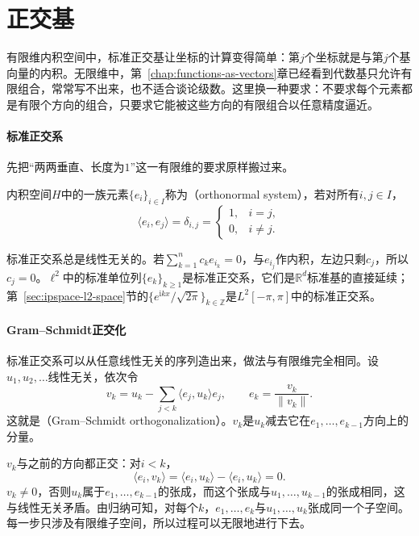 \section{正交基}
\label{sec:ipspace-orthonormal-bases}

有限维内积空间中，标准正交基让坐标的计算变得简单：第$j$个坐标就是与第$j$个基向量的内积。无限维中，第~\ref{chap:functions-as-vectors}章已经看到代数基只允许有限组合，常常写不出来，也不适合谈论级数。这里换一种要求：不要求每个元素都是有限个方向的组合，只要求它能被这些方向的有限组合以任意精度逼近。

\paragraph{标准正交系}
先把“两两垂直、长度为$1$”这一有限维的要求原样搬过来。

\begin{definition}[标准正交系]
\label{def:ipspace-orthonormal-system}
内积空间$H$中的一族元素$\{e_i\}_{i\in I}$称为（orthonormal system），若对所有$i,j\in I$，
\begin{equation}
 \langle e_i,e_j\rangle=\delta_{i,j}=\begin{cases}1,&i=j,\\0,&i\neq j.\end{cases}
 \label{eq:ipspace-orthonormal}
\end{equation}
\end{definition}

标准正交系总是线性无关的。若$\sum_{k=1}^nc_ke_{i_k}=0$，与$e_{i_j}$作内积，左边只剩$c_j$，所以$c_j=0$。$\ell^2$中的标准单位列$\{e_k\}_{k\geq1}$是标准正交系，它们是$\mathbb R^d$标准基的直接延续；第~\ref{sec:ipspace-l2-space}节的$\{e^{\mathrm ikx}/\sqrt{2\pi}\}_{k\in\mathbb Z}$是$L^2[-\pi,\pi]$中的标准正交系。

\paragraph{Gram--Schmidt正交化}
标准正交系可以从任意线性无关的序列造出来，做法与有限维完全相同。设$u_1,u_2,\ldots$线性无关，依次令
\begin{equation}
 v_k=u_k-\sum_{j<k}\langle e_j,u_k\rangle e_j,\qquad e_k=\frac{v_k}{\lVert v_k\rVert}.
 \label{eq:ipspace-gram-schmidt}
\end{equation}
这就是（Gram--Schmidt orthogonalization）。$v_k$是$u_k$减去它在$e_1,\ldots,e_{k-1}$方向上的分量。

$v_k$与之前的方向都正交：对$i<k$，
\[
 \langle e_i,v_k\rangle=\langle e_i,u_k\rangle-\langle e_i,u_k\rangle=0 .
\]
$v_k\neq0$，否则$u_k$属于$e_1,\ldots,e_{k-1}$的张成，而这个张成与$u_1,\ldots,u_{k-1}$的张成相同，这与线性无关矛盾。由归纳可知，对每个$k$，$e_1,\ldots,e_k$与$u_1,\ldots,u_k$张成同一个子空间。每一步只涉及有限维子空间，所以过程可以无限地进行下去。

